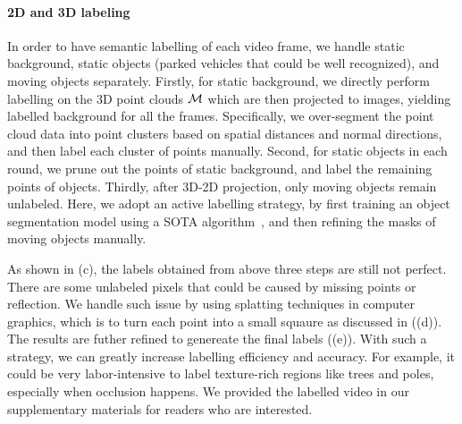 \paragraph{2D and 3D labeling}
In order to have semantic labelling of each video frame, we handle static background, static objects (\eg parked vehicles that could be well recognized), and moving objects separately.
Firstly, for static background, we directly perform labelling on the 3D point clouds ${\mathcal M}$ which are then projected to images, yielding labelled background for all the frames.
Specifically, we over-segment the point cloud data into point clusters based on spatial distances and normal directions, and then label each cluster of points manually.
Second, for static objects in each round, we prune out the points of static background, and label the remaining points of objects.
Thirdly, after 3D-2D projection, only moving objects remain unlabeled. Here, we adopt an active labelling strategy, by first training an object segmentation model using a SOTA algorithm~\cite{WuSH16e}, and then refining the masks of moving objects manually.

As shown in (c), the labels obtained from above three steps are still not perfect. There are some unlabeled pixels that could be caused by missing points or reflection. We handle such issue by using splatting techniques in computer graphics, which is to turn each point into a small squaure as discussed in  ((d)). The results are futher refined to genereate the final labels ((e)).
With such a strategy, we can greatly increase labelling efficiency and accuracy. For example, it could be very labor-intensive to label texture-rich regions like trees and poles, especially when occlusion happens.
We provided the labelled video in our supplementary materials for readers who are interested.

